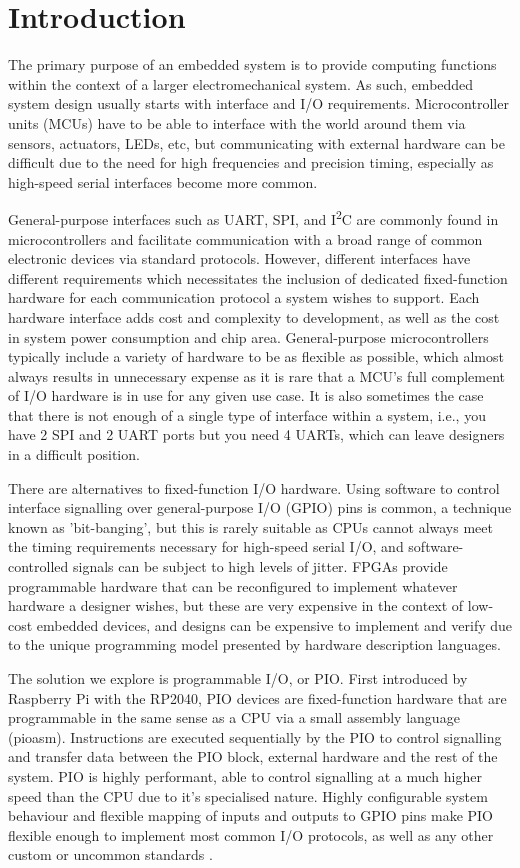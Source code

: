 \chapter{Introduction}
\label{ch:introduction}

The primary purpose of an embedded system is to provide computing functions within the context of a larger electromechanical system. As such, embedded system design usually starts with interface and I/O requirements. Microcontroller units (MCUs) have to be able to interface with the world around them via sensors, actuators, LEDs, etc, but communicating with external hardware can be difficult due to the need for high frequencies and precision timing, especially as high-speed serial interfaces become more common.

General-purpose interfaces such as UART, SPI, and I\textsuperscript{2}C are commonly found in microcontrollers and facilitate communication with a broad range of common electronic devices via standard protocols. However, different interfaces have different requirements which necessitates the inclusion of dedicated fixed-function hardware for each communication protocol a system wishes to support. Each hardware interface adds cost and complexity to development, as well as the cost in system power consumption and chip area. General-purpose microcontrollers typically include a variety of hardware to be as flexible as possible, which almost always results in unnecessary expense as it is rare that a MCU's full complement of I/O hardware is in use for any given use case. It is also sometimes the case that there is not enough of a single type of interface within a system, i.e., you have 2 SPI and 2 UART ports but you need 4 UARTs, which can leave designers in a difficult position.

There are alternatives to fixed-function I/O hardware. Using software to control interface signalling over general-purpose I/O (GPIO) pins is common, a technique known as 'bit-banging', but this is rarely suitable as CPUs cannot always meet the timing requirements necessary for high-speed serial I/O, and software-controlled signals can be subject to high levels of jitter. FPGAs provide programmable hardware that can be reconfigured to implement whatever hardware a designer wishes, but these are very expensive in the context of low-cost embedded devices, and designs can be expensive to implement and verify due to the unique programming model presented by hardware description languages.

The solution we explore is programmable I/O, or PIO. First introduced by Raspberry Pi with the RP2040, PIO devices are fixed-function hardware that are programmable in the same sense as a CPU via a small assembly language (pioasm). Instructions are executed sequentially by the PIO to control signalling and transfer data between the PIO block, external hardware and the rest of the system. PIO is highly performant, able to control signalling at a much higher speed than the CPU due to it's specialised nature. Highly configurable system behaviour and flexible mapping of inputs and outputs to GPIO pins make PIO flexible enough to implement most common I/O protocols, as well as any other custom or uncommon standards \cite{rp2040}.

